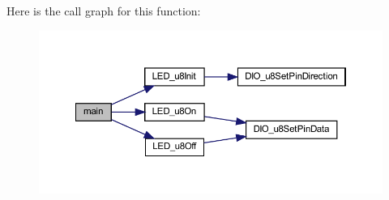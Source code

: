 Here is the call graph for this function\+:\nopagebreak
\begin{figure}[H]
\begin{center}
\leavevmode
\includegraphics[width=350pt]{main_8c_ae66f6b31b5ad750f1fe042a706a4e3d4_cgraph}
\end{center}
\end{figure}
